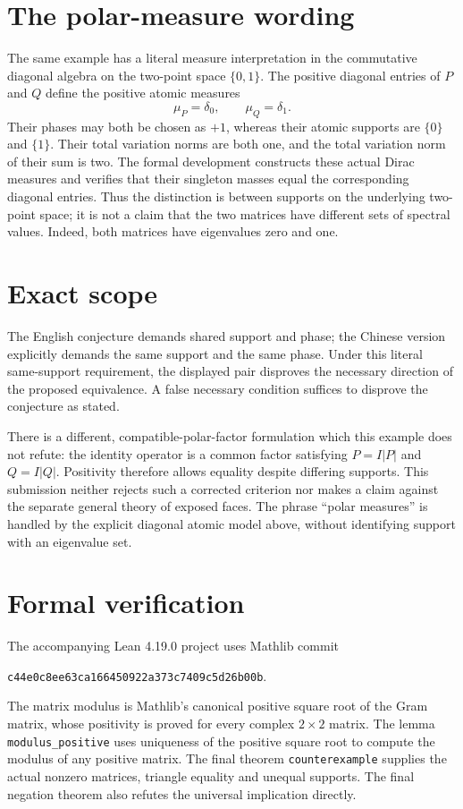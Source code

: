 \documentclass[11pt]{article}
\begin{document}
\newpage
\section*{The polar-measure wording}
The same example has a literal measure interpretation in the commutative diagonal algebra on the two-point space $\{0,1\}$. The positive diagonal entries of $P$ and $Q$ define the positive atomic measures
\[
 \mu_P=\delta_0,\qquad \mu_Q=\delta_1.
\]
Their phases may both be chosen as $+1$, whereas their atomic supports are $\{0\}$ and $\{1\}$. Their total variation norms are both one, and the total variation norm of their sum is two. The formal development constructs these actual Dirac measures and verifies that their singleton masses equal the corresponding diagonal entries. Thus the distinction is between supports on the underlying two-point space; it is not a claim that the two matrices have different sets of spectral values. Indeed, both matrices have eigenvalues zero and one.

\section*{Exact scope}
The English conjecture demands shared support and phase; the Chinese version explicitly demands the same support and the same phase. Under this literal same-support requirement, the displayed pair disproves the necessary direction of the proposed equivalence. A false necessary condition suffices to disprove the conjecture as stated.

There is a different, compatible-polar-factor formulation which this example does not refute: the identity operator is a common factor satisfying $P=I|P|$ and $Q=I|Q|$. Positivity therefore allows equality despite differing supports. This submission neither rejects such a corrected criterion nor makes a claim against the separate general theory of exposed faces. The phrase ``polar measures'' is handled by the explicit diagonal atomic model above, without identifying support with an eigenvalue set.

\section*{Formal verification}
The accompanying Lean 4.19.0 project uses Mathlib commit
\begin{center}\small\texttt{c44e0c8ee63ca166450922a373c7409c5d26b00b}.\end{center}
The matrix modulus is Mathlib's canonical positive square root of the Gram matrix, whose positivity is proved for every complex $2\times2$ matrix. The lemma \texttt{modulus\_positive} uses uniqueness of the positive square root to compute the modulus of any positive matrix. The final theorem \texttt{counterexample} supplies the actual nonzero matrices, triangle equality and unequal supports. The final negation theorem also refutes the universal implication directly.
\end{document}
